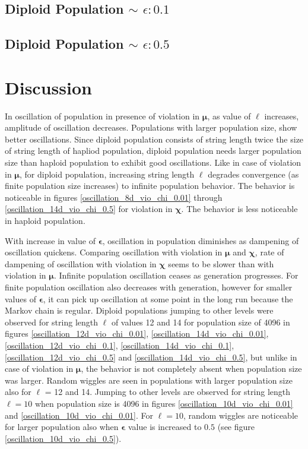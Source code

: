 \subsection{Diploid Population $\mathtt{\sim}$ $\epsilon: 0.1$}

\subsection{Diploid Population $\mathtt{\sim}$ $\epsilon: 0.5$}


\section{Discussion}
In oscillation of population in presence of violation in $\bm{\mu}$, 
as value of $\ell$ increases, amplitude of oscillation decreases. 
Populations with larger population size, show better oscillations. 
Since diploid population consists of string length twice the size of string length of hapliod population, 
diploid population needs larger population size than haploid population to exhibit good oscillations. 
Like in case of violation in $\bm{\mu}$, for diploid population, increasing string length $\ell$ 
degrades convergence (as finite population size increases) to infinite population behavior. 
The behavior is noticeable in figures 
\ref{oscillation_8d_vio_chi_0.01} through \ref{oscillation_14d_vio_chi_0.5} for violation in $\bm{\chi}$. 
The behavior is less noticeable in haploid population.

With increase in value of $\bm{\epsilon}$, 
oscillation in population diminishes as dampening of oscillation quickens. 
Comparing oscillation with violation in $\bm{\mu}$ and $\bm{\chi}$, rate of dampening of oscillation with violation 
in $\bm{\chi}$ seems to be slower than with violation in ${\bm{\mu}}$. 
Infinite population oscillation ceases as generation progresses.
For finite population oscillation also decreases with generation, however for smaller values of $\bm{\epsilon}$, 
it can pick up oscillation at some point in the long run because the Markov chain is regular.
Diploid populations jumping to other levels 
were observed for string length $\ell$ of values 12 and 14 for population size of 4096 in 
figures \ref{oscillation_12d_vio_chi_0.01}, \ref{oscillation_14d_vio_chi_0.01}, \ref{oscillation_12d_vio_chi_0.1}, 
\ref{oscillation_14d_vio_chi_0.1}, \ref{oscillation_12d_vio_chi_0.5} and \ref{oscillation_14d_vio_chi_0.5}, 
but unlike in case of violation in $\bm{\mu}$, the behavior is not completely absent when population size was larger. 
Random wiggles are seen in populations with larger population size also for $\ell$ = 12 and 14. 
Jumping to other levels are observed for string length $\ell = 10$ when population size is 4096 in figures \ref{oscillation_10d_vio_chi_0.01} 
and \ref{oscillation_10d_vio_chi_0.01}.
For $\ell = 10$, random wiggles are 
noticeable for larger population also when $\bm{\epsilon}$ value is increased to $0.5$ (see figure \ref{oscillation_10d_vio_chi_0.5}).

